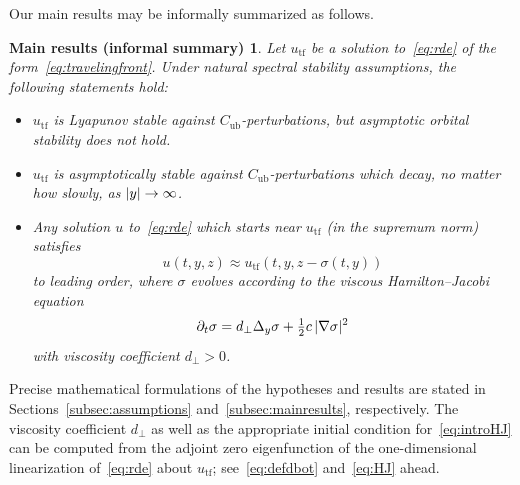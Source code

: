 \documentclass[12pt,oneside,a4paper,reqno]{amsart}
\numberwithin{equation}{section}
\newtheorem*{ttheorem}{Main results (informal summary)}
\theoremstyle{definition}
\theoremstyle{remark}
\newcommand{\Cub}{{C_{\mathrm{ub}}}}
\DeclarePairedDelimiter{\abs}{\lvert}{\rvert}
\begin{document}
Our main results may be informally summarized as follows.
\begin{ttheorem}
    Let $u_{\mathrm{tf}}$ be a solution to~\eqref{eq:rde} of the form~\eqref{eq:travelingfront}.
    Under natural spectral stability assumptions, the following statements hold:
    \begin{itemize}
        \item $u_{\mathrm{tf}}$ is Lyapunov stable against $\Cub$-perturbations, but asymptotic orbital stability does not hold.
        \item $u_{\mathrm{tf}}$ is asymptotically stable against $\Cub$-perturbations which decay, no matter how slowly, as $\abs{y} \to \infty$.
        \item Any solution $u$ to~\eqref{eq:rde} which starts near $u_{\mathrm{tf}}$ (in the supremum norm) satisfies
        \begin{equation*}
            u(t,y,z) \approx u_{\mathrm{tf}}(t,y,z - \sigma(t,y))
        \end{equation*}
        to leading order, where $\sigma$ evolves according to the viscous Hamilton--Jacobi equation
        \begin{equation}
            \label{eq:introHJ}
            \partial_t \sigma = d_{\bot}\Delta_y \sigma + \tfrac{1}{2}c\,\abs{\nabla{\sigma}}^2
        \end{equation}
        with viscosity coefficient $d_{\bot} > 0$.
    \end{itemize}
\end{ttheorem}
Precise mathematical formulations of the hypotheses and results are stated in Sections~\ref{subsec:assumptions} and~\ref{subsec:mainresults}, respectively.
The viscosity coefficient $d_{\bot}$ as well as the appropriate initial condition for~\eqref{eq:introHJ} can be computed from the adjoint zero eigenfunction of the one-dimensional linearization of~\eqref{eq:rde} about $u_{\mathrm{tf}}$; see~\eqref{eq:defdbot} and~\eqref{eq:HJ} ahead.
\end{document}
